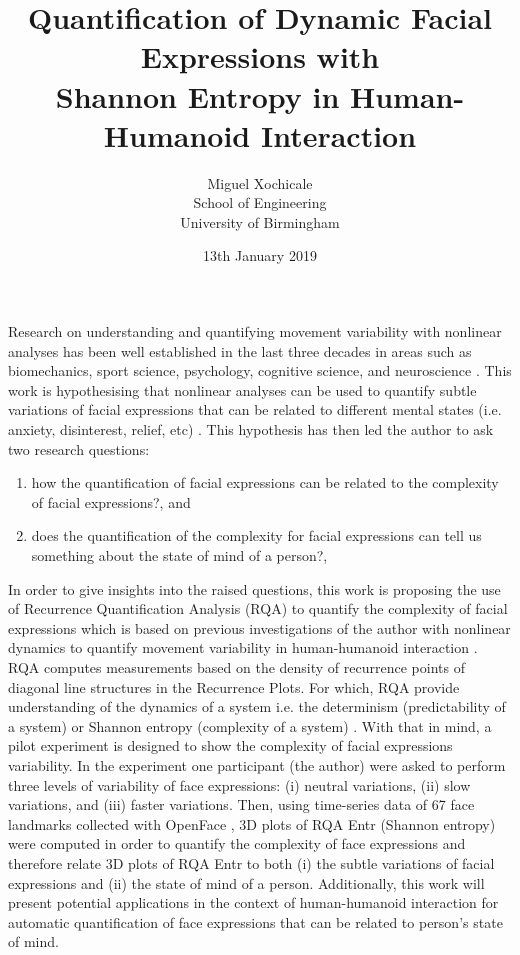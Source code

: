 \documentclass[12pt]{article}
\title{
Quantification of Dynamic Facial Expressions with \\
Shannon Entropy in Human-Humanoid Interaction
}
\author{Miguel Xochicale \\
School of Engineering \\
University of Birmingham}
\date{13th January 2019}
\begin{document}
\maketitle
\thispagestyle{empty} %

Research on understanding and quantifying movement variability 
with nonlinear analyses has been well established in the last three 
decades in areas such as biomechanics, sport science, psychology, 
cognitive science, and neuroscience \citep{davids2003}.
This work is hypothesising that nonlinear analyses 
can be used to quantify subtle variations of facial expressions 
that can be related to different mental states 
(i.e. anxiety, disinterest, relief, etc) \citep{back2014}.
This hypothesis has then led the author to ask two research questions: 
\begin{enumerate}[label=(\roman*)]
\item how the quantification of facial expressions can be related to  
	the complexity of facial expressions?, and 
\item does the quantification of the complexity for facial expressions 
	can tell us something about the state of mind of a person?, 
\end{enumerate}


In order to give insights into the raised questions,
this work is proposing 
the use of Recurrence Quantification Analysis (RQA) 
to quantify the complexity of facial expressions 
which is based on previous investigations of the author 
with nonlinear dynamics to quantify movement variability 
in human-humanoid interaction \citep{XochicalePhDThesis2018}.
RQA computes measurements based on the density of 
recurrence points of diagonal line 
structures in the Recurrence Plots.
For which, RQA provide understanding of the dynamics of a system i.e. 
the determinism (predictability of a system) or 
Shannon entropy (complexity of a system) \citep{marwan2007}.
With that in mind, a pilot experiment is designed 
to show the complexity of facial expressions variability. 
In the experiment one participant (the author) 
were asked to perform 
three levels of variability of face expressions:
(i) neutral variations, (ii) slow variations, and (iii) faster variations.
Then, using time-series data of 67 face landmarks collected 
with OpenFace \citep{baltrusaitis2018}, 3D plots
of RQA Entr (Shannon entropy) were computed in order
to quantify the complexity of face expressions and 
therefore relate 3D plots of RQA Entr 
to both (i) the subtle variations of facial expressions 
and (ii) the state of mind of a person. Additionally,
this work will present potential applications 
in the context of human-humanoid interaction
for automatic quantification of face expressions 
that can be related to person's state of mind. 




\end{document}
